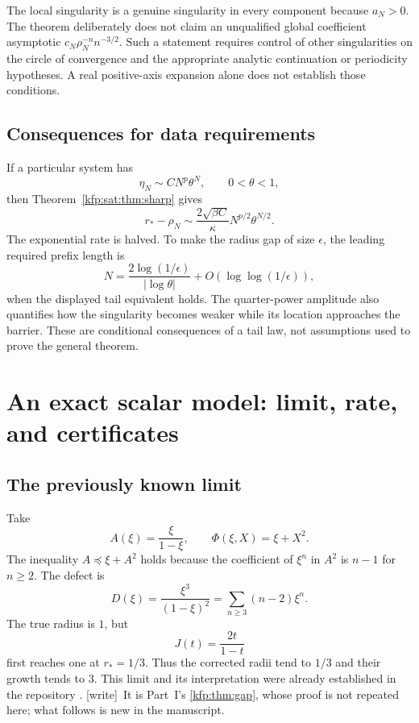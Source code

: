 \documentclass[11pt,a4paper]{article}
\theoremstyle{definition}
\theoremstyle{remark}
\newcommand{\wtag}{\textsf{\small[write]}}
\begin{document}
The local singularity is a genuine singularity in every component because
$a_N>0$. The theorem deliberately does not claim an unqualified global
coefficient asymptotic $c_N\rho_N^{-n}n^{-3/2}$. Such a statement requires
control of other singularities on the circle of convergence and the
appropriate analytic continuation or periodicity hypotheses. A real
positive-axis expansion alone does not establish those conditions.

\subsection{Consequences for data requirements}
If a particular system has
\[
 \eta_N\sim C N^p\theta^N,\qquad 0<\theta<1,
\]
then Theorem~\ref{kfp:sat:thm:sharp} gives
\[
 r_*-\rho_N\sim\frac{2\sqrt{\beta C}}{\kappa}
                 N^{p/2}\theta^{N/2}.
\]
The exponential rate is halved. To make the radius gap of size
$\epsilon$, the leading required prefix length is
\[
 N=\frac{2\log(1/\epsilon)}{|\log\theta|}
       +O(\log\log(1/\epsilon)),
\]
when the displayed tail equivalent holds. The quarter-power amplitude
also quantifies how the singularity becomes weaker while its location
approaches the barrier. These are conditional consequences of a tail law,
not assumptions used to prove the general theorem.

\section{An exact scalar model: limit, rate, and certificates}
\label{kfp:sat:sec:scalar}

\subsection{The previously known limit}
Take
\begin{equation}\label{kfp:sat:eq:scalar-model}
 A(\xi)=\frac \xi{1-\xi},\qquad \Phi(\xi,X)=\xi+X^2.
\end{equation}
The inequality $A\preceq \xi+A^2$ holds because the coefficient of $\xi^n$
in $A^2$ is $n-1$ for $n\ge2$. The defect is
\begin{equation}\label{kfp:sat:eq:scalar-defect}
 D(\xi)=\frac{\xi^3}{(1-\xi)^2}
     =\sum_{n\ge3}(n-2)\xi^n.
\end{equation}
The true radius is $1$, but
\[
 J(t)=\frac{2t}{1-t}
\]
first reaches one at $r_*=1/3$. Thus the corrected radii tend to $1/3$
and their growth tends to $3$. This limit and its interpretation were
already established in the repository \cite{satprefix}.
\wtag\ It is Part~I's \cref{kfp:thm:gap}, whose proof is not
repeated here; what follows is new in the manuscript.
\end{document}
